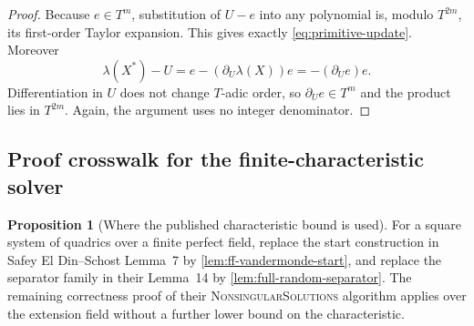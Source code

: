 \documentclass[11pt,a4paper]{article}
\theoremstyle{definition}
\newtheorem{proposition}[theorem]{Proposition}
\theoremstyle{remark}
\begin{document}
\begin{proof}
Because $e\in T^m$, substitution of $U-e$ into any polynomial is, modulo $T^{2m}$, its first-order Taylor expansion.  This gives exactly \eqref{eq:primitive-update}.  Moreover
\[
 \lambda(X^*)-U
 =e-(\partial_U\lambda(X))e
 =-(\partial_U e)e.
\]
Differentiation in $U$ does not change $T$-adic order, so $\partial_Ue\in T^m$ and the product lies in $T^{2m}$.  Again, the argument uses no integer denominator.
\end{proof}

\subsection{Proof crosswalk for the finite-characteristic solver}

\begin{proposition}[Where the published characteristic bound is used]\label{prop:characteristic-crosswalk}
For a square system of quadrics over a finite perfect field, replace the start construction in Safey El Din--Schost Lemma~7 by \cref{lem:ff-vandermonde-start}, and replace the separator family in their Lemma~14 by \cref{lem:full-random-separator}.  The remaining correctness proof of their \textsc{NonsingularSolutions} algorithm applies over the extension field without a further lower bound on the characteristic.
\end{proposition}
\end{document}
